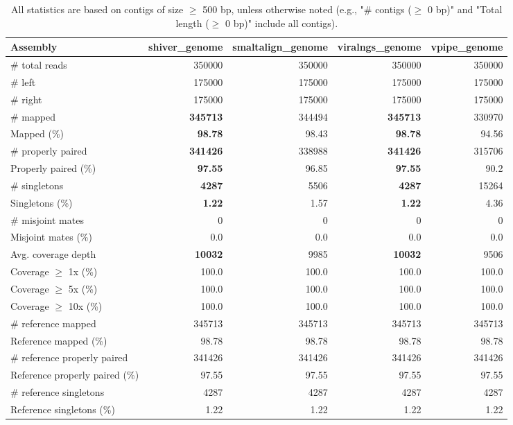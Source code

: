 \documentclass[12pt,a4paper]{article}
\begin{document}
\begin{table}[ht]
\begin{center}
\caption{All statistics are based on contigs of size $\geq$ 500 bp, unless otherwise noted (e.g., "\# contigs ($\geq$ 0 bp)" and "Total length ($\geq$ 0 bp)" include all contigs).}
\begin{tabular}{|l*{4}{|r}|}
\hline
Assembly & shiver\_genome & smaltalign\_genome & viralngs\_genome & vpipe\_genome \\ \hline
\# total reads & 350000 & 350000 & 350000 & 350000 \\ \hline
\# left & 175000 & 175000 & 175000 & 175000 \\ \hline
\# right & 175000 & 175000 & 175000 & 175000 \\ \hline
\# mapped & {\bf 345713} & 344494 & {\bf 345713} & 330970 \\ \hline
Mapped (\%) & {\bf 98.78} & 98.43 & {\bf 98.78} & 94.56 \\ \hline
\# properly paired & {\bf 341426} & 338988 & {\bf 341426} & 315706 \\ \hline
Properly paired (\%) & {\bf 97.55} & 96.85 & {\bf 97.55} & 90.2 \\ \hline
\# singletons & {\bf 4287} & 5506 & {\bf 4287} & 15264 \\ \hline
Singletons (\%) & {\bf 1.22} & 1.57 & {\bf 1.22} & 4.36 \\ \hline
\# misjoint mates & 0 & 0 & 0 & 0 \\ \hline
Misjoint mates (\%) & 0.0 & 0.0 & 0.0 & 0.0 \\ \hline
Avg. coverage depth & {\bf 10032} & 9985 & {\bf 10032} & 9506 \\ \hline
Coverage $\geq$ 1x (\%) & 100.0 & 100.0 & 100.0 & 100.0 \\ \hline
Coverage $\geq$ 5x (\%) & 100.0 & 100.0 & 100.0 & 100.0 \\ \hline
Coverage $\geq$ 10x (\%) & 100.0 & 100.0 & 100.0 & 100.0 \\ \hline
\# reference mapped & 345713 & 345713 & 345713 & 345713 \\ \hline
Reference mapped (\%) & 98.78 & 98.78 & 98.78 & 98.78 \\ \hline
\# reference properly paired & 341426 & 341426 & 341426 & 341426 \\ \hline
Reference properly paired (\%) & 97.55 & 97.55 & 97.55 & 97.55 \\ \hline
\# reference singletons & 4287 & 4287 & 4287 & 4287 \\ \hline
Reference singletons (\%) & 1.22 & 1.22 & 1.22 & 1.22 \\ \hline

\end{tabular}
\end{center}
\end{table}
\end{document}
